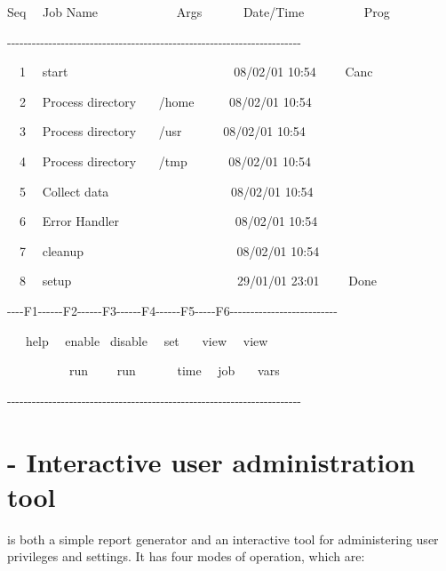 \begin{exparasmall}

Seq \ \ Job Name \ \ \ \ \ \ \ \ \ \ \ \ Args \ \ \ \ \ \ Date/Time
\ \ \ \ \ \ \ \ \ Prog

{}-{}-{}-{}-{}-{}-{}-{}-{}-{}-{}-{}-{}-{}-{}-{}-{}-{}-{}-{}-{}-{}-{}-{}-{}-{}-{}-{}-{}-{}-{}-{}-{}-{}-{}-{}-{}-{}-{}-{}-{}-{}-{}-{}-{}-{}-{}-{}-{}-{}-{}-{}-{}-{}-{}-{}-{}-{}-{}-{}-{}-{}-{}-{}-{}-{}-{}-{}-{}-{}-{}-

\ \ 1 \ \ start
\ \ \ \ \ \ \ \ \ \ \ \ \ \ \ \ \ \ \ \ \ \ \ \ \ \ 08/02/01 10:54
\ \ \ \ Canc

\ \ 2 \ \ Process directory \ \ \ /home \ \ \ \ \ 08/02/01 10:54

\ \ 3 \ \ Process directory \ \ \ /usr \ \ \ \ \ \ 08/02/01 10:54

\ \ 4 \ \ Process directory \ \ \ /tmp \ \ \ \ \ \ 08/02/01 10:54

\ \ 5 \ \ Collect data \ \ \ \ \ \ \ \ \ \ \ \ \ \ \ \ \ \ \ 08/02/01
10:54

\ \ 6 \ \ Error Handler \ \ \ \ \ \ \ \ \ \ \ \ \ \ \ \ \ \ 08/02/01
10:54

\ \ 7 \ \ cleanup
\ \ \ \ \ \ \ \ \ \ \ \ \ \ \ \ \ \ \ \ \ \ \ \ 08/02/01 10:54

\ \ 8 \ \ setup
\ \ \ \ \ \ \ \ \ \ \ \ \ \ \ \ \ \ \ \ \ \ \ \ \ \ 29/01/01 23:01
\ \ \ \ Done

\bigskip


\bigskip


\bigskip


{}-{}-{}-{}-F1-{}-{}-{}-{}-{}-F2-{}-{}-{}-{}-{}-F3-{}-{}-{}-{}-{}-F4-{}-{}-{}-{}-{}-F5-{}-{}-{}-{}-F6-{}-{}-{}-{}-{}-{}-{}-{}-{}-{}-{}-{}-{}-{}-{}-{}-{}-{}-{}-{}-{}-{}-{}-{}-{}-

\ \ \ help \ \ enable \ disable \ \ set \ \ \ view \ \ view

\ \ \ \ \ \ \ \ \ \ run \ \ \ \ run \ \ \ \ \ \ time \ \ job \ \ \ vars

{}-{}-{}-{}-{}-{}-{}-{}-{}-{}-{}-{}-{}-{}-{}-{}-{}-{}-{}-{}-{}-{}-{}-{}-{}-{}-{}-{}-{}-{}-{}-{}-{}-{}-{}-{}-{}-{}-{}-{}-{}-{}-{}-{}-{}-{}-{}-{}-{}-{}-{}-{}-{}-{}-{}-{}-{}-{}-{}-{}-{}-{}-{}-{}-{}-{}-{}-{}-{}-{}-{}-

\end{exparasmall}

\section{\BtuserName{} - Interactive user administration tool}
\label{bkm:Btuserdescr}\PrBtuser{} is both a simple
report generator and an interactive tool for administering user
privileges and settings. It has four modes of operation, which are:

